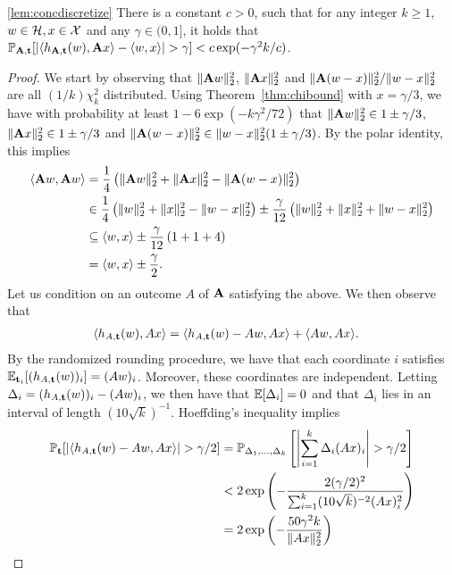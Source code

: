 \begin{customlem}{\ref{lem:concdiscretize}}
    There is a constant $c>0$, such that for any integer $k \geq 1$, $w \in \mathcal{H}, x \in \mathcal{X}$ and any $\gamma \in (0,1]$, it holds that 
    $
    \mathbb{P}_{\mathbf{A},\mathbf{t}}[|\langle h_{\mathbf{A},\mathbf{t}}(w),\mathbf{A} x\rangle - \langle w, x\rangle| > \gamma] < c\exp(-\gamma^2 k/c)
    $.    
\end{customlem}
\begin{proof} %
We start by observing that $\|\mathbf{A} w\|_2^2$, $\|\mathbf{A} x\|_2^2$ and $\|\mathbf{A} (w-x)\|_2^2/\|w-x\|_2^2$ are all $(1/k)\chi^2_k$ distributed. Using Theorem~\ref{thm:chibound} with $x=\gamma/3$, we have with probability at least $1-6 \exp(-k \gamma^2/72)$ that $\|\mathbf{A} w\|_2^2 \in 1 \pm \gamma/3$, $\|\mathbf{A} x\|_2^2 \in 1 \pm \gamma/3$ and $\|\mathbf{A}(w-x)\|_2^2 \in \|w-x\|_2^2(1 \pm \gamma/3)$. By the polar identity, this implies
\begin{align*}
\langle \mathbf{A} w, \mathbf{A} w \rangle &= \frac{1}{4} \left(\|\mathbf{A} w\|_2^2 + \|\mathbf{A} x\|_2^2 - \|\mathbf{A}(w-x)\|_2^2 \right) \\
&\in \frac{1}{4}\left(\|w\|_2^2 + \|x\|_2^2 - \|w-x\|_2^2 \right) \pm \frac{\gamma}{12}\left(\|w\|_2^2 + \|x\|_2^2 + \|w-x\|_2^2 \right) \\
&\subseteq \langle w, x \rangle \pm \frac{\gamma}{12}\left(1 + 1 + 4 \right) \\
&= \langle w, x \rangle \pm \frac{\gamma}{2}.
\end{align*}
Let us condition on an outcome $A$ of $\mathbf{A}$ satisfying the above. We then observe that
\begin{align*}
\langle h_{A, \mathbf{t}}(w) , A x\rangle &= \langle h_{A, \mathbf{t}}(w) - A w, A x\rangle + \langle A w, A x\rangle.
\end{align*}
By the randomized rounding procedure, we have that each coordinate $i$ satisfies $\mathbb{E}_{\mathbf{t}_i}[(h_{A,\mathbf{t}}(w))_i] = (A w)_i$. Moreover, these coordinates are independent. Letting $\Delta_i = (h_{A,\mathbf{t}}(w))_i - (A w)_i$, we then have that $\mathbb{E}[\Delta_i] = 0$ and that $\Delta_i$ lies in an interval of length $(10 \sqrt{k})^{-1}$. Hoeffding's inequality implies
\begin{align*}
\Pr_{\rt}[\left|\langle h_{A, \rt}(w) - A w, A x\rangle\right| > \gamma/2] &= \Pr_{\Delta_1,\dots,\Delta_k}\left[\left|\sum_{i=1}^k \Delta_i(A x)_i\right| > \gamma/2\right] \\
&< 2 \exp\left( -\frac{2 (\gamma/2)^2}{\sum_{i=1}^k (10 \sqrt{k})^{-2}(Ax)_i^2} \right) \\
&= 2 \exp\left( -\frac{50 \gamma^2 k}{\|A x\|_2^2} \right) \\

\end{align*}
\end{proof}
